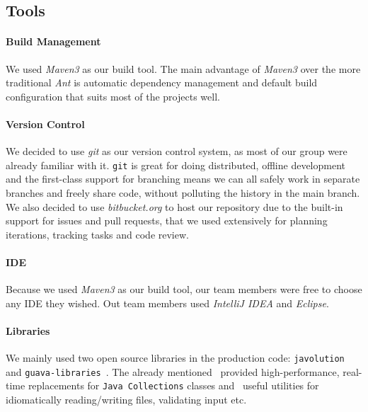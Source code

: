 \subsection{Tools}

\paragraph{Build Management}

We used \textit{Maven3} as our build tool. The main advantage of \textit{Maven3} over the more traditional \textit{Ant} is automatic dependency management and default build configuration that suits most of the projects well.

\paragraph{Version Control}
We decided to use \textit{git} as our version control system, as most of our group were already familiar with it. \texttt{git} is great for doing distributed, offline development and the first-class support for branching means we can all safely work in separate branches and freely share code, without polluting the history in the main branch. We also decided to use \textit{bitbucket.org} to host our repository due to the built-in support for issues and pull requests, that we used extensively for planning iterations, tracking tasks and code review.

\paragraph{IDE}
Because we used \textit{Maven3} as our build tool, our team members were free to choose any IDE they wished. Out team members used \textit{IntelliJ IDEA} and \textit{Eclipse}.

\paragraph{Libraries}
We mainly used two open source libraries in the production code: \texttt{javolution}~\cite{javolution} and \texttt{guava-libraries}~\cite{guava}. The already mentioned~\cite{javolution} provided high-performance, real-time replacements for \texttt{Java Collections} classes and~\cite{guava} useful utilities for idiomatically reading/writing files, validating input etc.

